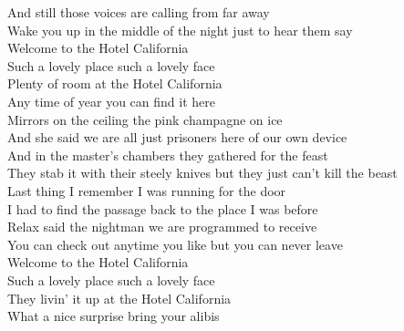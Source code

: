  And still those voices are calling from  far away\\
 Wake you up in the middle of the night  just to hear them say\\
 Welcome to the Hotel California\\
Such a  lovely place such a  lovely face\\
 Plenty of room at the Hotel California\\
Any  time of year you can  find it here\\
 Mirrors on the ceiling  the pink champagne on ice\\
And she said  we are all just prisoners here  of our own device\\
 And in the master's chambers  they gathered for the feast\\
 They stab it with their steely knives but they  just can't kill the beast\\
 Last thing I remember I was  running for the door\\
 I had to find the passage back to the  place I was before\\
 Relax said the nightman we are  programmed to receive\\
 You can check out anytime you like  but you can never leave\\
 Welcome to the Hotel California\\
Such a  lovely place such a  lovely face\\
They  livin' it up at the Hotel California\\
What a  nice surprise bring your  alibis  
